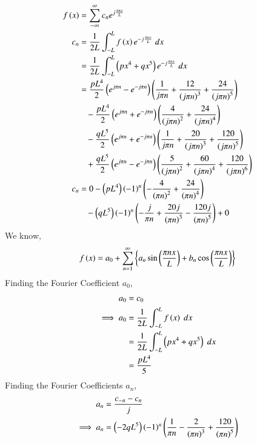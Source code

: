 \documentclass[journal,12pt,twocolumn]{IEEEtran}
\theoremstyle{remark}
\begin{document}
\begin{align}
    f\left(x\right)&=\sum_{-\infty}^{\infty}c_ne^{j\frac{\pi nx}{L}}\\
    c_n&=\frac{1}{2L}\int_{-L}^{L}f\left(x\right)e^{-j\frac{\pi n x}{L}}\;dx\\
    &=\frac{1}{2L}\int_{-L}^{L}\left(px^4+qx^5\right)e^{-j\frac{\pi n x}{L}}\;dx\\
    &=\frac{pL^4}{2}\left(e^{j\pi n}-e^{-j\pi n}\right)\left(\frac{1}{j\pi n}+\frac{12}{\left(j\pi n\right)^3}+\frac{24}{\left(j\pi n\right)^5}\right)\notag\\
    &\;\;\;-\frac{pL^4}{2}\left(e^{j\pi n}+e^{-j\pi n}\right)\left(\frac{4}{\left(j\pi n\right)^2}+\frac{24}{\left(j\pi n\right)^4}\right)\notag\\
    &\;\;\;-\frac{qL^5}{2}\left(e^{j\pi n}+e^{-j\pi n}\right)\left(\frac{1}{j\pi n}+\frac{20}{\left(j\pi n\right)^3}+\frac{120}{\left(j\pi n\right)^5}\right)\notag\\
    &\;\;\;+\frac{qL^5}{2}\left(e^{j\pi n}-e^{-j\pi n}\right)\left(\frac{5}{\left(j\pi n\right)^2}+\frac{60}{\left(j\pi n\right)^4}+\frac{120}{\left(j\pi n\right)^6}\right)\\
    c_n&=0-\left(pL^4\right)\left(-1\right)^n\left(-\frac{4}{\left(\pi n\right)^2}+\frac{24}{\left(\pi n\right)^4}\right)\notag\\
    &\;\;\;-\left(qL^5\right)\left(-1\right)^n\left(-\frac{j}{{\pi n}}+\frac{20j}{\left(\pi n\right)^3}-\frac{120j}{\left(\pi n\right)^5}\right)+0
\end{align}
We know,
\begin{align}
    f\left(x\right)=a_0+\sum_{n=1}^{\infty}\left\{a_n\sin\left(\frac{\pi n x}{L}\right)+b_n\cos\left(\frac{\pi n x}{L}\right)\right\}
\end{align}
Finding the Fourier Coefficient $a_0$,
\begin{align}
    a_0&=c_0\\
    \implies a_0&=\frac{1}{2L}\int_{-L}^{L}f\left(x\right)\;dx\\
    &=\frac{1}{2L}\int_{-L}^{L}\left(px^4+qx^5\right)\;dx\\
    &=\frac{pL^4}{5}
\end{align}
Finding the Fourier Coefficients $a_n$,
\begin{align}
    a_n&=\frac{c_{-n}-c_n}{j}\\
    \implies a_n&=\left(-2qL^5\right)\left(-1\right)^{n}\left(\frac{1}{\pi n}-\frac{2}{\left(\pi n\right)^3}+\frac{120}{\left(\pi n\right)^5}\right)
\end{align}
\end{document}

